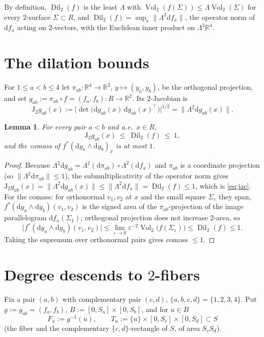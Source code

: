 \documentclass[11pt]{article}
\newtheorem{lemma}{Lemma}
\theoremstyle{remark}
\newcommand{\Vol}{\operatorname{Vol}}
\newcommand{\Dil}{\operatorname{Dil}}
\newcommand{\RR}{\mathbb{R}}
\newcommand{\dd}{\mathrm{d}}
\newcommand{\Jac}{\mathrm{J}}
\begin{document}
By definition, $\Dil_2(f)$ is the least $\Lambda$ with
$\Vol_2(f(\Sigma))\le\Lambda\Vol_2(\Sigma)$ for every $2$-surface $\Sigma\subset R$, and
$\Dil_2(f)=\sup_x\|\Lambda^2\dd f_x\|$, the operator norm of $\dd f_x$ acting on
$2$-vectors, with the Euclidean inner product on $\Lambda^2\RR^4$.

\section{The dilation bounds}

For $1\le a<b\le4$ let $\pi_{ab}\colon\RR^4\to\RR^2$, $y\mapsto(y_a,y_b)$, be the orthogonal
projection, and set $g_{ab}:=\pi_{ab}\circ f=(f_a,f_b)\colon R\to\RR^2$. Its $2$-Jacobian is
\[
\Jac_2 g_{ab}(x):=\bigl|\det\bigl(\dd g_{ab}(x)\,\dd g_{ab}(x)^{\!\top}\bigr)\bigr|^{1/2}
=\bigl\|\Lambda^2\dd g_{ab}(x)\bigr\| .
\]

\begin{lemma}\label{lem:dil}
For every pair $a<b$ and a.e.\ $x\in R$,
\begin{equation}\label{eq:jac}
\Jac_2 g_{ab}(x)\ \le\ \Dil_2(f)\ \le\ 1,
\end{equation}
and the comass of $f^*(\dd y_a\wedge \dd y_b)_x$ is at most $1$.
\end{lemma}

\begin{proof}
Because $\Lambda^2\dd g_{ab}=\Lambda^2(\dd\pi_{ab})\circ\Lambda^2(\dd f_x)$ and
$\pi_{ab}$ is a coordinate projection (so $\|\Lambda^2\dd\pi_{ab}\|\le1$), the
submultiplicativity of the operator norm gives
$\Jac_2 g_{ab}(x)=\|\Lambda^2\dd g_{ab}(x)\|\le\|\Lambda^2\dd f_x\|=\Dil_2(f)\le1$, which is
\eqref{eq:jac}. For the comass: for orthonormal $v_1,v_2$ at $x$ and the small square
$\Sigma_\varepsilon$ they span, $f^*(\dd y_a\wedge \dd y_b)(v_1,v_2)$ is the signed area of
the $\pi_{ab}$-projection of the image parallelogram $\dd f_x(\Sigma_1)$; orthogonal
projection does not increase $2$-area, so
\[
\bigl|f^*(\dd y_a\wedge \dd y_b)(v_1,v_2)\bigr|
\le\lim_{\varepsilon\to0}\varepsilon^{-2}\Vol_2\bigl(f(\Sigma_\varepsilon)\bigr)\le\Dil_2(f)\le1 .
\]
Taking the supremum over orthonormal pairs gives comass $\le1$.
\end{proof}

\section{Degree descends to $2$-fibers}

Fix a pair $(a,b)$ with complementary pair $(c,d)$, $\{a,b,c,d\}=\{1,2,3,4\}$. Put
$g:=g_{ab}=(f_a,f_b)$, $B:=[0,S_a]\times[0,S_b]$, and for $u\in B$
\[
F_u:=g^{-1}(u),\qquad T_u:=\{u\}\times[0,S_c]\times[0,S_d]\subset S
\]
(the fiber and the complementary $\{c,d\}$-rectangle of $S$, of area $S_cS_d$).
\end{document}
